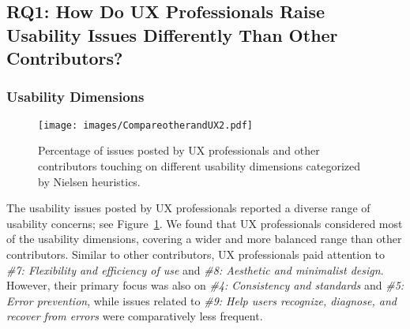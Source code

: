 \subsection{RQ1: How Do UX Professionals Raise Usability Issues Differently Than Other Contributors?}

\subsubsection{Usability Dimensions}

\begin{figure}[t]
  \centering
    \texttt{[image: images/CompareotherandUX2.pdf]}
    \caption{Percentage of issues posted by UX professionals and other contributors touching on different usability dimensions categorized by Nielsen heuristics.}
    \label{fig:frequency-Nielsen-heuristics}
\end{figure}

The usability issues posted by UX professionals reported a diverse range of usability concerns; see Figure~\ref{fig:frequency-Nielsen-heuristics}. We found that UX professionals considered most of the usability dimensions, covering a wider and more balanced range than other contributors. Similar to other contributors, UX professionals paid attention to \textit{\#7: Flexibility and efficiency of use} and \textit{\#8: Aesthetic and minimalist design}. However, their primary focus was also on \textit{\#4: Consistency and standards} and \textit{\#5: Error prevention}, while issues related to \textit{\#9: Help users recognize, diagnose, and recover from errors} were comparatively less frequent.

